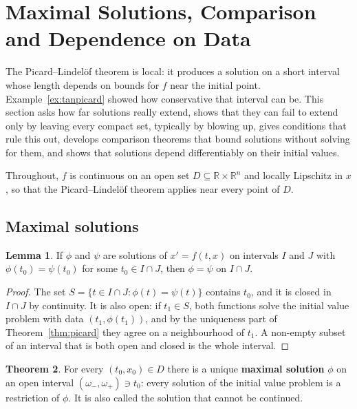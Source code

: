 \documentclass[11pt,a4paper]{article}
\numberwithin{equation}{section}
\theoremstyle{definition}
\newtheorem{thm}{Theorem}[subsection]
\newtheorem{lem}[thm]{Lemma}
\begin{document}
\section{Maximal Solutions, Comparison and Dependence on Data}
\label{sec:maximal}

The Picard--Lindel\"of theorem is local: it produces a solution on a short interval whose length depends on bounds for $f$ near the initial point.
Example~\ref{ex:tanpicard} showed how conservative that interval can be. This section asks how far solutions really extend, shows that they can fail
to extend only by leaving every compact set, typically by blowing up, gives conditions that rule this out, develops comparison theorems that bound
solutions without solving for them, and shows that solutions depend differentiably on their initial values.

Throughout, $f$ is continuous on an open set $D \subseteq \mathbb R \times \mathbb R^n$ and locally Lipschitz in $x$, so that the Picard--Lindel\"of theorem applies near every point of $D$.

\subsection{Maximal solutions}
\label{ssec:maxsol}

\begin{lem}
\label{lem:agree}
If $\phi$ and $\psi$ are solutions of $x' = f(t, x)$ on intervals $I$ and $J$ with $\phi(t_0) = \psi(t_0)$ for some $t_0 \in I \cap J$, then $\phi = \psi$ on $I \cap J$.
\end{lem}

\begin{proof}
The set $S = \{t \in I \cap J : \phi(t) = \psi(t)\}$ contains $t_0$, and it is closed in $I \cap J$ by continuity. It is also open: if $t_1 \in S$, both functions solve the initial value
problem with data $(t_1, \phi(t_1))$, and by the uniqueness part of Theorem~\ref{thm:picard} they agree on a neighbourhood of $t_1$. A non-empty subset of an interval that is
both open and closed is the whole interval.
\end{proof}

\begin{thm}
\label{thm:maximal}
For every $(t_0, x_0) \in D$ there is a unique \textbf{maximal solution} $\phi$ on an open interval $(\omega_-, \omega_+) \ni t_0$: every solution of the initial value problem is a restriction of
$\phi$. It is also called the solution that cannot be continued.
\end{thm}
\end{document}
